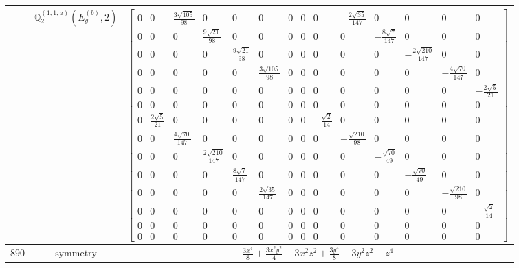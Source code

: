 \documentclass[fleqn,8pt,landscape]{jsarticle}
\begin{document}
\begin{longtable}{ccc}
$  $ & $ \mathbb{Q}_{2}^{(1,1;a)}(E_{g}^{(b)},2) $ & $ \begin{bmatrix} 0 & 0 & \frac{3 \sqrt{105}}{98} & 0 & 0 & 0 & 0 & 0 & 0 & - \frac{2 \sqrt{35}}{147} & 0 & 0 & 0 & 0 \\ 0 & 0 & 0 & \frac{9 \sqrt{21}}{98} & 0 & 0 & 0 & 0 & 0 & 0 & - \frac{8 \sqrt{7}}{147} & 0 & 0 & 0 \\ 0 & 0 & 0 & 0 & \frac{9 \sqrt{21}}{98} & 0 & 0 & 0 & 0 & 0 & 0 & - \frac{2 \sqrt{210}}{147} & 0 & 0 \\ 0 & 0 & 0 & 0 & 0 & \frac{3 \sqrt{105}}{98} & 0 & 0 & 0 & 0 & 0 & 0 & - \frac{4 \sqrt{70}}{147} & 0 \\ 0 & 0 & 0 & 0 & 0 & 0 & 0 & 0 & 0 & 0 & 0 & 0 & 0 & - \frac{2 \sqrt{5}}{21} \\ 0 & 0 & 0 & 0 & 0 & 0 & 0 & 0 & 0 & 0 & 0 & 0 & 0 & 0 \\ 0 & \frac{2 \sqrt{5}}{21} & 0 & 0 & 0 & 0 & 0 & 0 & - \frac{\sqrt{2}}{14} & 0 & 0 & 0 & 0 & 0 \\ 0 & 0 & \frac{4 \sqrt{70}}{147} & 0 & 0 & 0 & 0 & 0 & 0 & - \frac{\sqrt{210}}{98} & 0 & 0 & 0 & 0 \\ 0 & 0 & 0 & \frac{2 \sqrt{210}}{147} & 0 & 0 & 0 & 0 & 0 & 0 & - \frac{\sqrt{70}}{49} & 0 & 0 & 0 \\ 0 & 0 & 0 & 0 & \frac{8 \sqrt{7}}{147} & 0 & 0 & 0 & 0 & 0 & 0 & - \frac{\sqrt{70}}{49} & 0 & 0 \\ 0 & 0 & 0 & 0 & 0 & \frac{2 \sqrt{35}}{147} & 0 & 0 & 0 & 0 & 0 & 0 & - \frac{\sqrt{210}}{98} & 0 \\ 0 & 0 & 0 & 0 & 0 & 0 & 0 & 0 & 0 & 0 & 0 & 0 & 0 & - \frac{\sqrt{2}}{14} \\ 0 & 0 & 0 & 0 & 0 & 0 & 0 & 0 & 0 & 0 & 0 & 0 & 0 & 0 \\ 0 & 0 & 0 & 0 & 0 & 0 & 0 & 0 & 0 & 0 & 0 & 0 & 0 & 0 \end{bmatrix} $ \\ \hline
$ 890 $ & $ \text{symmetry} $ & $ \frac{3 x^{4}}{8} + \frac{3 x^{2} y^{2}}{4} - 3 x^{2} z^{2} + \frac{3 y^{4}}{8} - 3 y^{2} z^{2} + z^{4} $ \\

\end{longtable}
\end{document}

